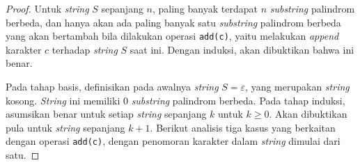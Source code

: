 \documentclass[11pt, a4paper, final]{article}
\begin{document}
\begin{proof}

Untuk \textit{string} $S$ sepanjang $n$, paling banyak terdapat $n$ \textit{substring} palindrom berbeda, dan hanya akan ada paling banyak satu \textit{substring} palindrom berbeda yang akan bertambah bila dilakukan operasi \texttt{add(c)}, yaitu melakukan \textit{append} karakter $c$ terhadap \textit{string} $S$ saat ini. Dengan induksi, akan dibuktikan bahwa ini benar.

Pada tahap basis, definisikan pada awalnya \textit{string} $S = \varepsilon$, yang merupakan \textit{string} kosong. \textit{String} ini memiliki $0$ \textit{substring} palindrom berbeda. Pada tahap induksi, asumsikan benar untuk setiap \textit{string} sepanjang $k$ untuk $k \geq 0$. Akan dibuktikan pula untuk \textit{string} sepanjang $k + 1$. Berikut analisis tiga kasus yang berkaitan dengan operasi \texttt{add(c)}, dengan penomoran karakter dalam \textit{string} dimulai dari satu.


\end{proof}
\end{document}
